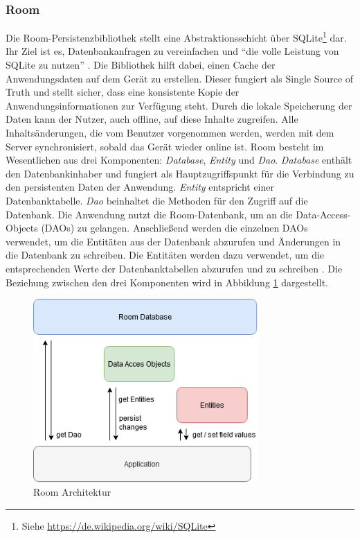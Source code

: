\documentclass[a4paper]{article}
\begin{document}
\subsubsection{Room}
\label{subsubsec:technologies:bibs:room}
Die Room-Persistenzbibliothek stellt eine Abstraktionsschicht über SQLite\footnote{Siehe \url{https://de.wikipedia.org/wiki/SQLite}} dar. Ihr Ziel ist es, Datenbankanfragen zu vereinfachen und "`die volle Leistung von SQLite zu nutzen"' \autocite{android_room_architecture}. Die Bibliothek hilft dabei, einen Cache der Anwendungsdaten auf dem Gerät zu erstellen. Dieser fungiert als Single Source of Truth und stellt sicher, dass eine konsistente Kopie der Anwendungsinformationen zur Verfügung steht. Durch die lokale Speicherung der Daten kann der Nutzer, auch offline, auf diese Inhalte zugreifen. Alle Inhaltsänderungen, die vom Benutzer vorgenommen werden, werden mit dem Server synchronisiert, sobald das Gerät wieder online ist.\newline
Room besteht im Wesentlichen aus drei Komponenten: \textit{Database}, \textit{Entity} und \textit{Dao}. \textit{Database} enthält den Datenbankinhaber und fungiert als Hauptzugriffspunkt für die Verbindung zu den persistenten Daten der Anwendung. \textit{Entity} entspricht einer Datenbanktabelle. \textit{Dao} beinhaltet die Methoden für den Zugriff auf die Datenbank. Die Anwendung nutzt die Room-Datenbank, um an die Data-Access-Objects (DAOs) zu gelangen. Anschließend werden die einzelnen DAOs verwendet, um die Entitäten aus der Datenbank abzurufen und Änderungen in die Datenbank zu schreiben. Die Entitäten werden dazu verwendet, um die entsprechenden Werte der Datenbanktabellen abzurufen und zu schreiben \autocite{android_room_data_storage}. Die Beziehung zwischen den drei Komponenten wird in Abbildung \ref{fig:room} dargestellt.

\begin{figure}[H]
	\centering
	\includegraphics[height=7cm,keepaspectratio]{./images/Room.png}
	\caption{Room Architektur}
	\label{fig:room}
\end{figure}
\end{document}
